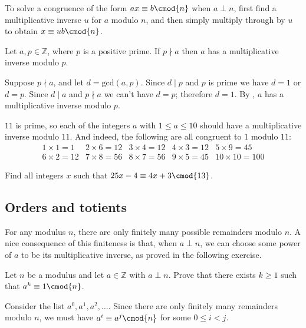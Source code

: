 \begin{prooftip}
To solve a congruence of the form $ax \equiv b \cmod{n}$ when $a \perp n$, first find a multiplicative inverse $u$ for $a$ modulo $n$, and then simply multiply through by $u$ to obtain $x \equiv ub \cmod{n}$.
\end{prooftip}

\begin{corollary}
Let $a,p \in \mathbb{Z}$, where $p$ is a positive prime. If $p \nmid a$ then $a$ has a multiplicative inverse modulo $p$.
\end{corollary}
\begin{cproof}
Suppose $p \nmid a$, and let $d = \mathrm{gcd}(a,p)$. Since $d \mid p$ and $p$ is prime we have $d=1$ or $d=p$. Since $d \mid a$ and $p \nmid a$ we can't have $d=p$; therefore $d=1$. By , $a$ has a multiplicative inverse modulo $p$.
\end{cproof}

\begin{example}
$11$ is prime, so each of the integers $a$ with $1 \le a \le 10$ should have a multiplicative inverse modulo $11$. And indeed, the following are all congruent to $1$ modulo $11$:
\[ \begin{matrix}
1 \times 1 = 1 & 2 \times 6 = 12 & 3 \times 4 = 12 & 4 \times 3 = 12 & 5 \times 9 = 45 \\ 6 \times 2 = 12 & 7 \times 8 = 56 & 8 \times 7 = 56 & 9 \times 5 = 45 & 10 \times 10 = 100
\end{matrix} \]
\end{example}

\begin{exercise}
Find all integers $x$ such that $25x-4 \equiv 4x+3 \cmod{13}$.
\end{exercise}

\subsection*{Orders and totients}

For any modulus $n$, there are only finitely many possible remainders modulo $n$. A nice consequence of this finiteness is that, when $a \perp n$, we can choose some power of $a$ to be its multiplicative inverse, as proved in the following exercise.

\begin{exercise}
\label{exPowerModN}
Let $n$ be a modulus and let $a \in \mathbb{Z}$ with $a \perp n$. Prove that there exists $k \ge 1$ such that $a^k \equiv 1 \cmod{n}$.
\begin{backhint}
Consider the list $a^0, a^1, a^2, \dots$. Since there are only finitely many remainders modulo $n$, we must have $a^i \equiv a^j \cmod{n}$ for some $0 \le i < j$.
\end{backhint}
\end{exercise}

